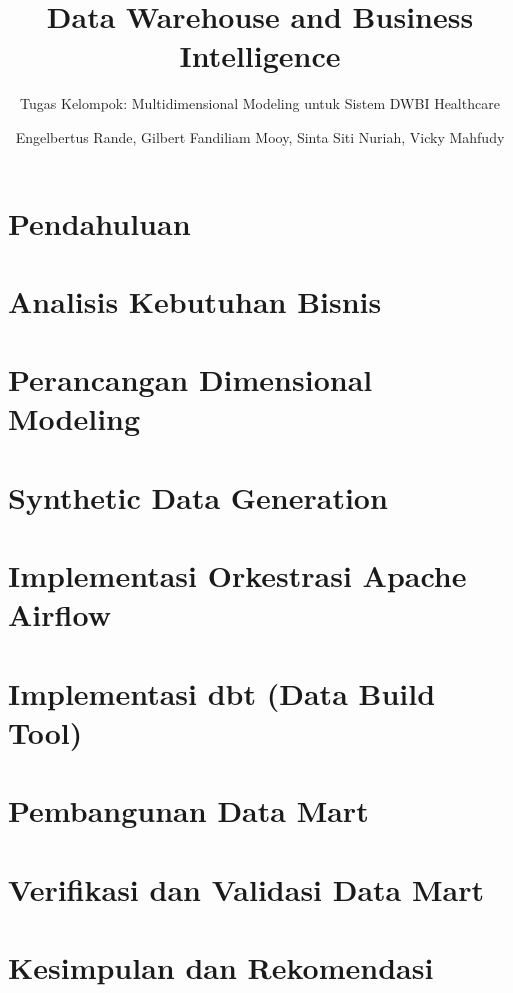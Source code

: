\documentclass[oneside,a4paper,11pt,explicit]{book}
\title{Data Warehouse and Business Intelligence}
\subtitle{Tugas Kelompok: Multidimensional Modeling untuk Sistem DWBI Healthcare}
\author{Engelbertus Rande, Gilbert Fandiliam Mooy, Sinta Siti Nuriah, Vicky Mahfudy}
\begin{document}
\maketitle
\nocite{*}
\frontmatter
\renewcommand{\baselinestretch}{0.6}\normalsize
\tableofcontents
\renewcommand{\baselinestretch}{1.0}\normalsize

\mainmatter{}
\normalsize
\part{Pendahuluan}


\part{Analisis Kebutuhan Bisnis}


\part{Perancangan Dimensional Modeling}


\part{Synthetic Data Generation}


\part{Implementasi Orkestrasi Apache Airflow}


\part{Implementasi dbt (Data Build Tool)}


\part{Pembangunan Data Mart}


\part{Verifikasi dan Validasi Data Mart}


\part{Kesimpulan dan Rekomendasi}


\backmatter{}



\printindex
\end{document}
